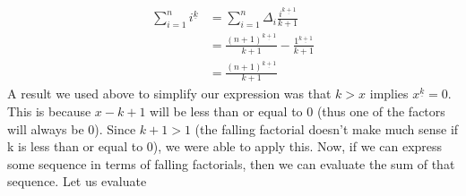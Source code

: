 \documentclass[12pt]{article}
\theoremstyle{definition}
\begin{document}
\begin{align*}
    \sum_{i=1}^n i^{\underline{k}} & = \sum_{i=1}^n \Delta_i \frac{i^{\underline{k+1}}}{k+1}                   \\
                                   & = \frac{(n+1)^{\underline{k+1}}}{k+1} - \frac{{1}^{\underline{k+1}}}{k+1} \\
                                   & = \frac{(n+1)^{\underline{k+1}}}{k+1}
\end{align*}
A result we used above to simplify our expression was that $k > x$ implies $x^{\underline{k}} = 0$.
This is because $x-k+1$ will be less than or equal to 0 (thus one of the factors will always be 0).
Since $k +1 > 1$ (the falling factorial doesn't make much sense if k is less than or equal to 0), we were able to apply this.
Now, if we can express some sequence in terms of falling factorials, then we can evaluate the sum of that sequence. Let us evaluate
\end{document}
